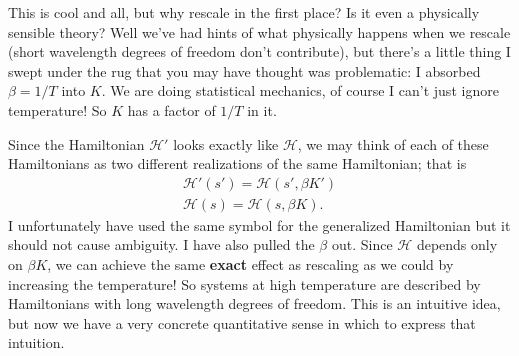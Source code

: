 \documentclass[main.tex]{subfiles}
\begin{document}
This is cool and all, but why rescale in the first place? Is it even a physically sensible theory? Well we've had hints of what physically happens when we rescale (short wavelength degrees of freedom don't contribute), but there's a little thing I swept under the rug that you may have thought was problematic: I absorbed $\beta = 1/T$ into $K$. We are doing statistical mechanics, of course I can't just ignore temperature! So $K$ has a factor of $1/T$ in it. 

Since the Hamiltonian $\mathcal{H}'$ looks exactly like $\mathcal{H}$, we may think of each of these Hamiltonians as two different realizations of the same Hamiltonian; that is
\begin{align*}
\mathcal{H}'(s') = {\mathcal{H}}(s',\beta K') \\
\mathcal{H} (s) = {\mathcal{H}}(s,\beta K).
\end{align*}
I unfortunately have used the same symbol for the generalized Hamiltonian but it should not cause ambiguity. I have also pulled the $\beta$ out. Since $\mathcal{H}$ depends only on $\beta K$, we can achieve the same \textbf{exact} effect as rescaling as we could by increasing the temperature! So systems at high temperature are described by Hamiltonians with long wavelength degrees of freedom. This is an intuitive idea, but now we have a very concrete quantitative sense in which to express that intuition.
\end{document}
